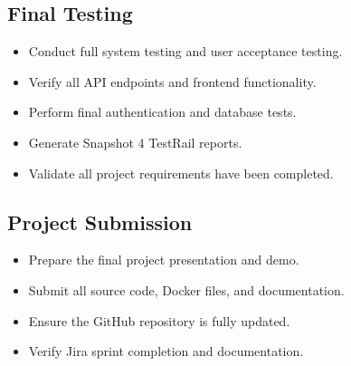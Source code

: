 \documentclass[12pt]{article}
\begin{document}
\subsection{Final Testing}
\begin{itemize}
\item Conduct full system testing and user acceptance testing.
\item Verify all API endpoints and frontend functionality.
\item Perform final authentication and database tests.
\item Generate Snapshot 4 TestRail reports.
\item Validate all project requirements have been completed.
\end{itemize}

\subsection{Project Submission}
\begin{itemize}
\item Prepare the final project presentation and demo.
\item Submit all source code, Docker files, and documentation.
\item Ensure the GitHub repository is fully updated.
\item Verify Jira sprint completion and documentation.
\end{itemize}
\end{document}
